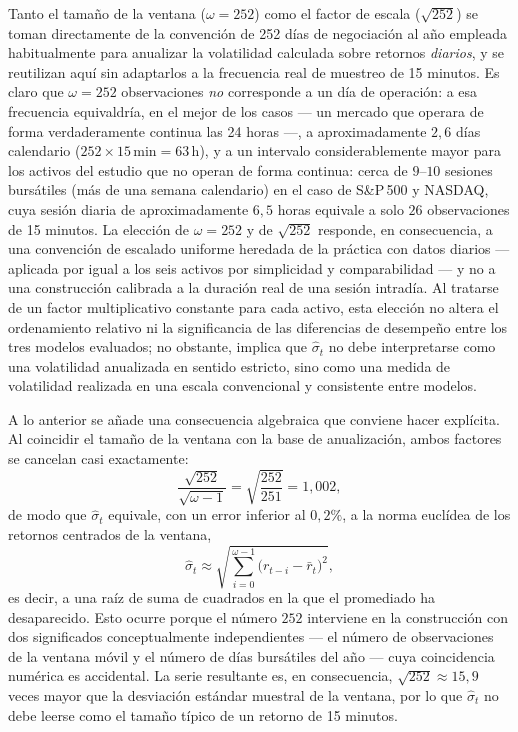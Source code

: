 \documentclass[12pt]{paper}
\begin{document}
\begin{itemize}
    Tanto el tamaño de la ventana ($\omega = 252$) como el factor de escala ($\sqrt{252}$) se toman directamente de la convención de 252 días de negociación al año empleada habitualmente para anualizar la volatilidad calculada sobre retornos \emph{diarios}, y se reutilizan aquí sin adaptarlos a la frecuencia real de muestreo de 15 minutos. Es claro que $\omega = 252$ observaciones \emph{no} corresponde a un día de operación: a esa frecuencia equivaldría, en el mejor de los casos --- un mercado que operara de forma verdaderamente continua las 24 horas ---, a aproximadamente $2{,}6$ días calendario ($252 \times 15\,\text{min} = 63\,\text{h}$), y a un intervalo considerablemente mayor para los activos del estudio que no operan de forma continua: cerca de $9$--$10$ sesiones bursátiles (más de una semana calendario) en el caso de S\&P\,500 y NASDAQ, cuya sesión diaria de aproximadamente $6{,}5$ horas equivale a solo $26$ observaciones de 15 minutos. La elección de $\omega = 252$ y de $\sqrt{252}$ responde, en consecuencia, a una convención de escalado uniforme heredada de la práctica con datos diarios --- aplicada por igual a los seis activos por simplicidad y comparabilidad --- y no a una construcción calibrada a la duración real de una sesión intradía. Al tratarse de un factor multiplicativo constante para cada activo, esta elección no altera el ordenamiento relativo ni la significancia de las diferencias de desempeño entre los tres modelos evaluados; no obstante, implica que $\hat{\sigma}_t$ no debe interpretarse como una volatilidad anualizada en sentido estricto, sino como una medida de volatilidad realizada en una escala convencional y consistente entre modelos.

    A lo anterior se añade una consecuencia algebraica que conviene hacer explícita. Al coincidir el tamaño de la ventana con la base de anualización, ambos factores se cancelan casi exactamente:
    \begin{equation}
        \frac{\sqrt{252}}{\sqrt{\omega - 1}} = \sqrt{\frac{252}{251}} = 1{,}002,
    \end{equation}
    de modo que $\hat{\sigma}_t$ equivale, con un error inferior al $0{,}2\%$, a la norma euclídea de los retornos centrados de la ventana,
    \begin{equation}
        \hat{\sigma}_t \approx \sqrt{\sum_{i=0}^{\omega-1}\bigl(r_{t-i} - \bar{r}_{t}\bigr)^{2}},
    \end{equation}
    es decir, a una raíz de suma de cuadrados en la que el promediado ha desaparecido. Esto ocurre porque el número $252$ interviene en la construcción con dos significados conceptualmente independientes --- el número de observaciones de la ventana móvil y el número de días bursátiles del año --- cuya coincidencia numérica es accidental. La serie resultante es, en consecuencia, $\sqrt{252} \approx 15{,}9$ veces mayor que la desviación estándar muestral de la ventana, por lo que $\hat{\sigma}_t$ no debe leerse como el tamaño típico de un retorno de 15 minutos.


\end{itemize}
\end{document}
